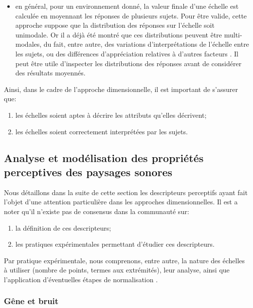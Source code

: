 \begin{itemize}
\item en général, pour un environnement donné, la valeur finale d'une échelle est calculée en moyennant les réponses de plusieurs sujets. Pour être valide, cette approche suppose que la distribution des réponses sur l'échelle soit unimodale. Or il a déjà été montré que ces distributions peuvent être multi-modales, du fait, entre autre, des variations d'interprétations de l'échelle entre les sujets, ou des différences d'appréciation relatives à d'autres facteurs \citep{raimbault2006qualitative}. Il peut être utile d'inspecter les distributions des réponses avant de considérer des résultats moyennés.

\end{itemize}

Ainsi, dans le cadre de l'approche dimensionnelle, il est important de s'assurer que:

\begin{enumerate}
\item les échelles soient aptes à décrire les attributs qu'elles décrivent;
\item les échelles soient correctement interprétées par les sujets.
\end{enumerate}

\subsection{Analyse et modélisation des propriétés perceptives des paysages sonores}
\label{sec:descripteursPercetifs}

Nous détaillons dans la suite de cette section les descripteurs perceptifs ayant fait l'objet d'une attention particulière dans les approches dimensionnelles. Il est a noter qu'il n'existe pas de consensus dans la communauté sur:

\begin{enumerate}
\item la définition de ces descripteurs; 
\item les pratiques expérimentales permettant d'étudier ces descripteurs.
\end{enumerate}

Par pratique expérimentale, nous comprenons, entre autre, la nature des échelles à utiliser (nombre de points, termes aux extrémités), leur analyse, ainsi que l'application d'éventuelles étapes de normalisation \citep{aletta2016soundscape}.

\subsubsection{Gêne et bruit}

